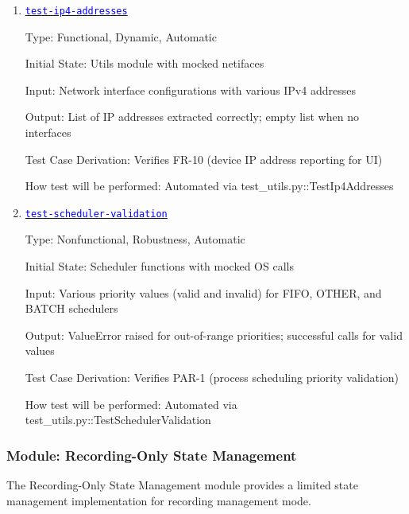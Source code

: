 \documentclass[12pt, titlepage]{article}
\newcommand{\tid}[1]{\hyperlink{tid:#1}{\textcolor{blue}{\texttt{#1}}}}
\begin{document}
\begin{enumerate}

  \item{\tid{test-ip4-addresses}\\}

        Type: Functional, Dynamic, Automatic

        Initial State: Utils module with mocked netifaces

        Input: Network interface configurations with various IPv4 addresses

        Output: List of IP addresses extracted correctly; empty list when no interfaces

        Test Case Derivation: Verifies FR-10 (device IP address reporting for UI)

        How test will be performed: Automated via test\_utils.py::TestIp4Addresses

  \item{\tid{test-scheduler-validation}\\}

        Type: Nonfunctional, Robustness, Automatic

        Initial State: Scheduler functions with mocked OS calls

        Input: Various priority values (valid and invalid) for FIFO, OTHER, and BATCH
        schedulers

        Output: ValueError raised for out-of-range priorities; successful calls for
        valid values

        Test Case Derivation: Verifies PAR-1 (process scheduling priority validation)

        How test will be performed: Automated via
        test\_utils.py::TestSchedulerValidation

\end{enumerate}

\subsubsection{Module: Recording-Only State Management}

The Recording-Only State Management module provides a limited state management
implementation for recording management mode.
\end{document}
